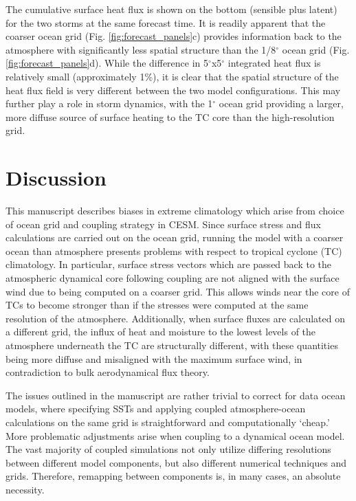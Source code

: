 \documentclass[draft,ms]{AGUTeX}
\newcommand{\degree}{$^{\circ}$}
\begin{document}
\begin{article}
The cumulative surface heat flux is shown on the bottom (sensible plus latent) for the two storms at the same forecast time. It is readily apparent that the coarser ocean grid (Fig. \ref{fig:forecast_panels}c) provides information back to the atmosphere with significantly less spatial structure than the 1/8\degree{} ocean grid (Fig. \ref{fig:forecast_panels}d). While the difference in 5\degree{}x5\degree{} integrated heat flux is relatively small (approximately 1\%), it is clear that the spatial structure of the heat flux field is very different between the two model configurations. This may further play a role in storm dynamics, with the 1\degree{} ocean grid providing a larger, more diffuse source of surface heating to the TC core than the high-resolution grid.

\section{Discussion}
\label{sec:discussion}

This manuscript describes biases in extreme climatology which arise from choice of ocean grid and coupling strategy in CESM. Since surface stress and flux calculations are carried out on the ocean grid, running the model with a coarser ocean than atmosphere presents problems with respect to tropical cyclone (TC) climatology. In particular, surface stress vectors which are passed back to the atmospheric dynamical core following coupling are not aligned with the surface wind due to being computed on a coarser grid. This allows winds near the core of TCs to become stronger than if the stresses were computed at the same resolution of the atmosphere. Additionally, when surface fluxes are calculated on a different grid, the influx of heat and moisture to the lowest levels of the atmosphere underneath the TC are structurally different, with these quantities being more diffuse and misaligned with the maximum surface wind, in contradiction to bulk aerodynamical flux theory.

The issues outlined in the manuscript are rather trivial to correct for data ocean models, where specifying SSTs and applying coupled atmosphere-ocean calculations on the same grid is straightforward and computationally `cheap.' More problematic adjustments arise when coupling to a dynamical ocean model. The vast majority of coupled simulations not only utilize differing resolutions between different model components, but also different numerical techniques and grids. Therefore, remapping between components is, in many cases, an absolute necessity.


\end{article}
\end{document}
